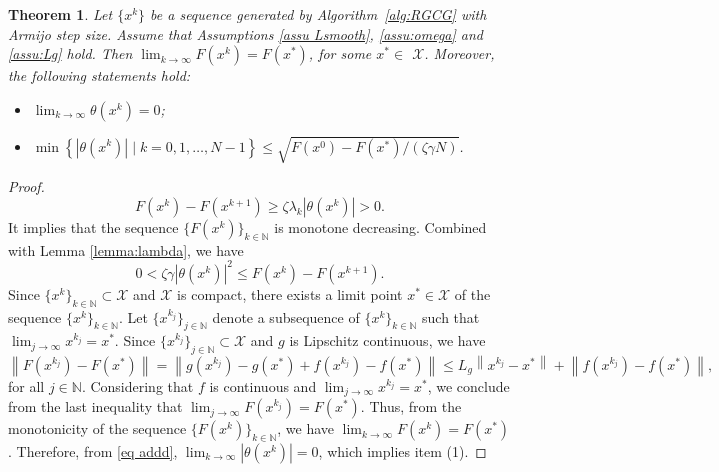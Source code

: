 \documentclass[pdflatex,sn-mathphys-num]{sn-jnl}%
\newtheorem{theorem}{Theorem}[section] %
\theoremstyle{definition} %
\theoremstyle{remark} %
\begin{document}
        \begin{theorem}
        Let $\{x^k\}$ be a sequence generated by Algorithm~\ref{alg:RGCG} with Armijo step size. Assume that Assumptions \ref{assu Lsmooth}, \ref{assu:omega} and \ref{assu:Lg} hold. Then $\lim _{k \rightarrow \infty} F(x^k)=F(x^*)$, for some $x^* \in$ $\mathcal{X}$. Moreover, the following statements hold:
        \begin{itemize}
            \item[(1)] $\lim _{k \rightarrow \infty} \theta (x^k )=0$;
            \item[(2)] $\min \left\{\left|\theta (x^k )\right| \mid k=0,1, \ldots, N-1\right\} \leq \sqrt{F(x^0)-F(x^{*}) /(\zeta \gamma N)}$.
        \end{itemize}    
    \end{theorem}
    \begin{proof}
        \begin{equation}\label{eq FDes}
            F(x^k)- F(x^{k+1}) \geq \zeta \lambda_k\left|\theta (x^k )\right|>0.
        \end{equation}
        It implies that the sequence $\{F (x^k)\}_{k \in \mathbb{N}}$ is monotone decreasing.
        Combined with Lemma \ref{lemma:lambda}, we have
        \begin{equation}\label{eq addd}
            0 < \zeta \gamma\left|\theta (x^k )\right|^2  \leq F (x^k )-F (x^{k+1} ).
        \end{equation}
         Since \( \{x^k\}_{k \in \mathbb{N}} \subset \mathcal{X} \) and \( \mathcal{X} \) is compact, there exists a limit point \( x^* \in \mathcal{X} \) of the sequence \( \{x^k\}_{k \in \mathbb{N}} \). Let \( \{x^{k_j}\}_{j \in \mathbb{N}} \) denote a subsequence of \( \{x^k\}_{k \in \mathbb{N}} \) such that \( \lim_{j \to \infty} x^{k_j} = x^* \).
         Since $ \{x^{k_j}\}_{j \in \mathbb{N}} \subset \mathcal{X}$ and $g$ is Lipschitz continuous, we have
        $$
        \left\|F (x^{k_j})-F (x^*)\right\|=\left\|g (x^{k_j})-g (x^*)+f (x^{k_j})-f (x^*)\right\| \leq L_g\left\|x^{k_j}-x^*\right\|+\left\|f (x^{k_j})-f (x^*)\right\|,
        $$
        for all $j \in \mathbb{N}$. Considering that $f$ is continuous and $\lim _{j \rightarrow \infty} x^{k_j}=x^*$, we conclude from the last inequality that $\lim _{j \rightarrow \infty} F (x^{k_j})=F (x^*)$. 
        Thus, from the monotonicity of the sequence $ \{F (x^k)\}_{k \in \mathbb{N}}$, we have $\lim _{k \rightarrow \infty} F (x^k)=F (x^*)$. Therefore, from \eqref{eq addd}, $\lim _{k \rightarrow \infty}\left|\theta (x^k)\right|=0$, which implies item (1). 


\end{proof}
\end{document}
